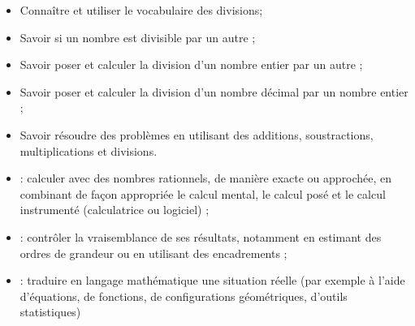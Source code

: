 \begin{myobj}
	\begin{itemize}
		\item Connaître et utiliser le vocabulaire des divisions;
		\item Savoir si un nombre est divisible par un autre ;
		\item Savoir poser et calculer la division d’un nombre entier par un autre ;
		\item Savoir poser et calculer la division d’un nombre décimal par un nombre entier ;
		\item Savoir résoudre des problèmes en utilisant des additions, soustractions, multiplications et divisions.
		
	\end{itemize}
\end{myobj}

\begin{mycomp}
	\begin{itemize}
		\item {} : calculer avec des nombres rationnels, de manière exacte ou approchée, en combinant de façon appropriée le calcul mental, le calcul posé et le calcul instrumenté (calculatrice ou logiciel) ; 
		\item {} : contrôler la vraisemblance de ses résultats, notamment en estimant des ordres de grandeur ou en utilisant des encadrements ;
		\item {} : traduire en langage mathématique une situation réelle (par exemple à l'aide d'équations, de fonctions, de configurations géométriques, d'outils statistiques) 
		
	\end{itemize}
\end{mycomp}